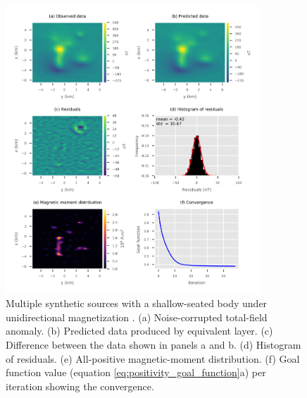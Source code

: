 \begin{figure}
	\centering
	\includegraphics[width=0.85\textwidth]{Fig/unidir_shallow_test/Fig3.png}
	\caption{Multiple synthetic sources with a shallow-seated body under unidirectional magnetization . (a) Noise-corrupted total-field anomaly. (b) Predicted data produced by equivalent layer. (c) Difference between the data shown in panels a and b. (d) Histogram of residuals. (e) All-positive magnetic-moment distribution. (f) Goal function value (equation \ref{eq:positivity_goal_function}a) per iteration showing the convergence.}
	\label{fig:unidir_shallow_test}
\end{figure}

